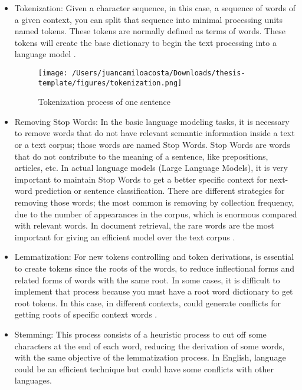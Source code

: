 \begin{itemize}
    \item Tokenization: Given a character sequence, in this case, a sequence of words of a given context, you can split that sequence into minimal processing units named tokens. These tokens are normally defined as terms of words. These tokens will create the base dictionary to begin the text processing into a language model \citet{information-retrieval}. 

    \begin{figure}[H]
    \centering
    \texttt{[image: /Users/juancamiloacosta/Downloads/thesis-template/figures/tokenization.png]}
    \caption{Tokenization process of one sentence \citet{information-retrieval} }
    \label{fig:tokenization}
    \end{figure}
    
    \item Removing Stop Words: In the basic language modeling tasks, it is necessary to remove words that do not have relevant semantic information inside a text or a text corpus; those words are named Stop Words. Stop Words are words that do not contribute to the meaning of a sentence, like prepositions, articles, etc. In actual language models (Large Language Models), it is very important to maintain Stop Words to get a better specific context for next-word prediction or sentence classification. There are different strategies for removing those words; the most common is removing by collection frequency, due to the number of appearances in the corpus, which is enormous compared with relevant words. In document retrieval, the rare words are the most important for giving an efficient model over the text corpus \citet{information-retrieval}. 
    \item Lemmatization: For new tokens controlling and token derivations, is essential to create tokens since the roots of the words, to reduce inflectional forms and related forms of words with the same root. In some cases, it is difficult to implement that process because you must have a root word dictionary to get root tokens. In this case, in different contexts, could generate conflicts for getting roots of specific context words \cite{information-retrieval}.
    \item Stemming: This process consists of a heuristic process to cut off some characters at the end of each word, reducing the derivation of some words, with the same objective of the lemmatization process. In English, language could be an efficient technique but could have some conflicts with other languages.
\end{itemize}


